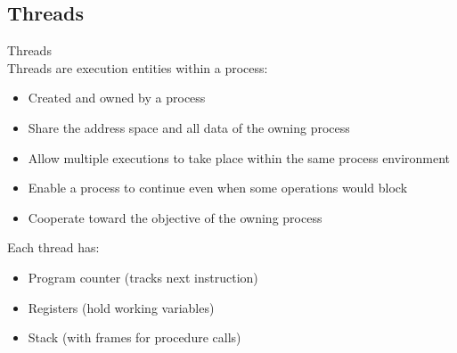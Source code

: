 \subsection{Threads}


\begin{definition}{Threads}\\
    Threads are execution entities within a process:
    \begin{itemize}
        \item Created and owned by a process
        \item Share the address space and all data of the owning process
        \item Allow multiple executions to take place within the same process environment
        \item Enable a process to continue even when some operations would block
        \item Cooperate toward the objective of the owning process
    \end{itemize}
    
    Each thread has:
    \begin{itemize}
        \item Program counter (tracks next instruction)
        \item Registers (hold working variables)
        \item Stack (with frames for procedure calls)
    \end{itemize}
\end{definition}


